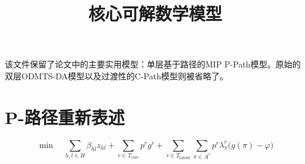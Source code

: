 \documentclass{article}
\title{核心可解数学模型}
\author{}
\date{}
\begin{document}
\maketitle

该文件保留了论文中的主要实用模型：单层基于路径的MIP P-Path模型。原始的双层ODMTS-DA模型以及过渡性的C-Path模型则被省略了。

\section{P-路径重新表述}

\begin{equation}
\min \quad
\sum_{h,l\in H} \beta_{hl} z_{hl}
+ \sum_{r\in T_{\mathrm{core}}} p^r g^r
+ \sum_{r\in T_{\mathrm{latent}}} \sum_{\pi\in A^r} p^r \lambda_\pi^r \bigl(g(\pi)-\varphi\bigr)
\tag{15a}
\end{equation}
\end{document}
